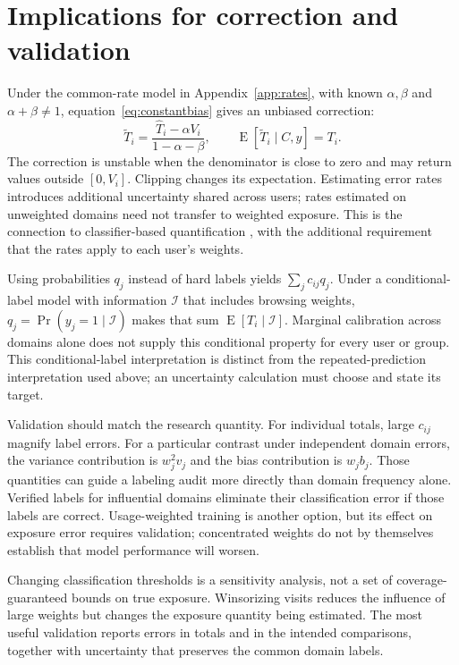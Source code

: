 \documentclass[11pt,letterpaper]{article}
\newcommand{\E}{\operatorname{E}}
\begin{document}


\section{Implications for correction and validation}
Under the common-rate model in Appendix~\ref{app:rates}, with known
$\alpha,\beta$ and
$\alpha+\beta\ne1$, equation~\eqref{eq:constantbias} gives an unbiased correction:
\begin{equation}\label{eq:correction}
 \widetilde T_i=\frac{\widehat T_i-\alpha V_i}{1-\alpha-\beta},\qquad
 \E[\widetilde T_i\mid C,y]=T_i.
\end{equation}
The correction is unstable when the denominator is close to zero and may return
values outside $[0,V_i]$. Clipping changes its expectation. Estimating error
rates introduces additional uncertainty shared across users; rates estimated
on unweighted domains need not transfer to weighted exposure. This is the
connection to classifier-based quantification \citep{vaz2019quantification},
with the additional requirement that the rates apply to each user's weights.

Using probabilities $q_j$ instead of hard labels yields $\sum_j c_{ij}q_j$.
Under a conditional-label model with information $\mathcal I$ that includes
browsing weights, $q_j=\Pr(y_j=1\mid\mathcal I)$ makes that sum
$\E[T_i\mid\mathcal I]$. Marginal calibration across domains alone does not
supply this conditional property for every user or group. This conditional-label
interpretation is distinct from the repeated-prediction interpretation used
above; an uncertainty calculation must choose and state its target.

Validation should match the research quantity. For individual totals, large
$c_{ij}$ magnify label errors. For a particular contrast under independent
domain errors, the variance contribution is $w_j^2v_j$ and the bias contribution
is $w_jb_j$. Those quantities can guide a labeling audit more directly than
domain frequency alone. Verified labels for influential domains eliminate their
classification error if those labels are correct. Usage-weighted training is
another option, but its effect on exposure error requires validation; concentrated
weights do not by themselves establish that model performance will worsen.

Changing classification thresholds is a sensitivity analysis, not a set of
coverage-guaranteed bounds on true exposure. Winsorizing visits reduces the
influence of large weights but changes the exposure quantity being estimated.
The most useful validation reports errors in totals and in the intended
comparisons, together with uncertainty that preserves the common domain labels.
\end{document}
